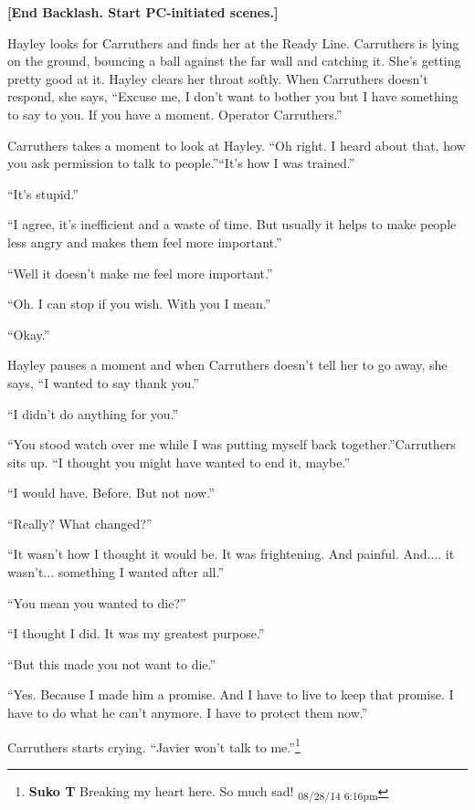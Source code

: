 \textbf{{[}End Backlash. Start PC-initiated scenes.{]}}



Hayley looks for Carruthers and finds her at the Ready Line.  Carruthers is lying on the ground, bouncing a ball against the far wall and catching it.  She's getting pretty good at it.  Hayley clears her throat softly.  When Carruthers doesn't respond, she says, ``Excuse me, I don't want to bother you but I have something to say to you. If you have a moment.  Operator Carruthers.''

Carruthers takes a moment to look at Hayley.  ``Oh right.  I heard about that, how you ask permission to talk to people.''``It's how I was trained.''

``It's stupid.''

``I agree, it's inefficient and a waste of time.  But usually it helps to make people less angry and makes them feel more important.''

``Well it doesn't make me feel more important.''

``Oh.  I can stop if you wish.  With you I mean.''

``Okay.''  

Hayley pauses a moment and when Carruthers doesn't tell her to go away, she says, ``I wanted to say thank you.''

``I didn't do anything for you.''

``You stood watch over me while I was putting myself back together.''Carruthers sits up.  ``I thought you might have wanted to end it, maybe.''

``I would have.  Before.  But not now.''

``Really?  What changed?''

``It wasn't how I thought it would be.  It was frightening.  And painful.  And.... it wasn't... something I wanted after all.''

``You mean you wanted to die?''

``I thought I did.  It was my greatest purpose.''

``But this made you not want to die.''

``Yes.  Because I made him a promise.  And I have to live to keep that promise.  I have to do what he can't anymore.  I have to protect them now.''

Carruthers starts crying.  ``Javier won't talk to me.''\footnote{\textbf{Suko T }Breaking my heart here.  So much sad! \textsubscript{08/28/14 6:16pm}}


